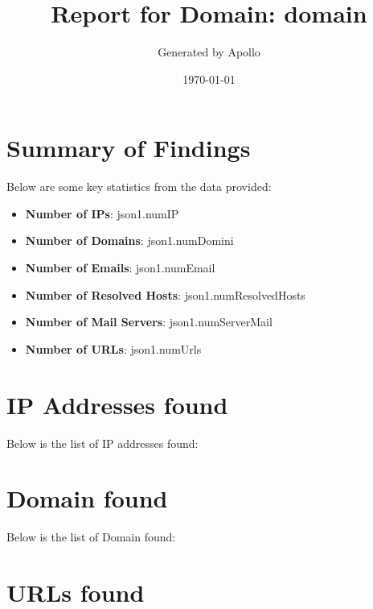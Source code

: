 \documentclass{article}
\title{Report for Domain: {{ domain }}}
\author{Generated by Apollo}
\date{\today}
\begin{document}
\maketitle

\section*{Summary of Findings}

Below are some key statistics from the data provided:

\begin{itemize}
    \item \textbf{Number of IPs}: {{ json1.numIP }}
    \item \textbf{Number of Domains}: {{ json1.numDomini }}
    \item \textbf{Number of Emails}: {{ json1.numEmail }}
    \item \textbf{Number of Resolved Hosts}: {{ json1.numResolvedHosts }}
    \item \textbf{Number of Mail Servers}: {{ json1.numServerMail }}
    \item \textbf{Number of URLs}: {{ json1.numUrls }}
\end{itemize}

\section*{IP Addresses found}

Below is the list of IP addresses found:




\section*{Domain found}

Below is the list of Domain found:




\section*{URLs found}
\end{document}
